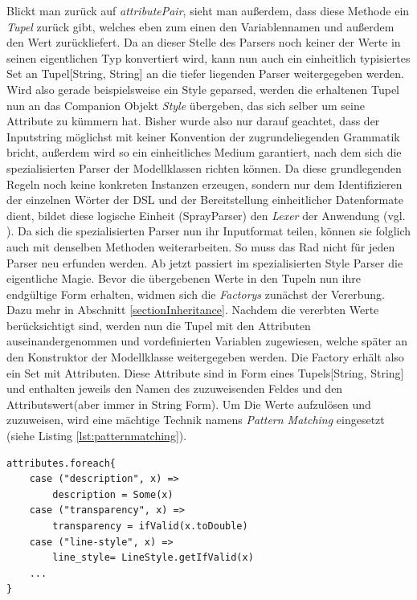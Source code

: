Blickt man zurück auf \textit{attributePair}, sieht man außerdem, dass diese Methode ein \textit{Tupel} zurück gibt, welches eben zum einen den Variablennamen und außerdem den Wert zurückliefert.
Da an dieser Stelle des Parsers noch keiner der Werte in seinen eigentlichen Typ konvertiert wird, kann nun auch ein einheitlich typisiertes Set an Tupel[String, String] an die tiefer liegenden Parser weitergegeben werden.
Wird also gerade beispielsweise ein Style geparsed, werden die erhaltenen Tupel nun an das Companion Objekt \textit{Style} übergeben, das sich selber um seine Attribute zu kümmern hat.
Bisher wurde also nur darauf geachtet, dass der Inputstring möglichst mit keiner Konvention der zugrundeliegenden Grammatik bricht, außerdem wird so ein einheitliches Medium garantiert, nach dem sich die spezialisierten Parser der Modellklassen richten können. Da diese grundlegenden Regeln noch keine konkreten Instanzen erzeugen, sondern nur dem Identifizieren der einzelnen Wörter der DSL und der Bereitstellung einheitlicher Datenformate dient, bildet diese logische Einheit (SprayParser) den \textit{Lexer} der Anwendung (vgl. ).
Da sich die spezialisierten Parser nun ihr Inputformat teilen, können sie folglich auch mit denselben Methoden weiterarbeiten.
So muss das Rad nicht für jeden Parser neu erfunden werden.
Ab jetzt passiert im spezialisierten Style Parser die eigentliche Magie.
Bevor die übergebenen Werte in den Tupeln nun ihre endgültige Form erhalten, widmen sich die \textit{Factorys} zunächst der Vererbung. Dazu mehr in Abschnitt \ref{sectionInheritance}.
Nachdem die vererbten Werte berücksichtigt sind, werden nun die Tupel mit den Attributen auseinandergenommen und vordefinierten Variablen zugewiesen, welche später an den Konstruktor der Modellklasse weitergegeben werden.
Die Factory erhält also ein Set mit Attributen. Diese Attribute sind in Form eines Tupels[String, String] und enthalten jeweils den Namen des zuzuweisenden Feldes und den Attributswert(aber immer in String Form). Um Die Werte aufzulösen und zuzuweisen, wird eine mächtige Technik namens \textit{Pattern Matching} eingesetzt (siehe Listing \ref{lst:patternmatching}).
\begin{lstlisting}[style=scala, caption = {Pattern Matching im Style Parser}, label = {lst:patternmatching}]
attributes.foreach{
    case ("description", x) => 
    	description = Some(x)
    case ("transparency", x) => 
    	transparency = ifValid(x.toDouble)
    case ("line-style", x) => 
    	line_style= LineStyle.getIfValid(x)
    ...
}
\end{lstlisting}
